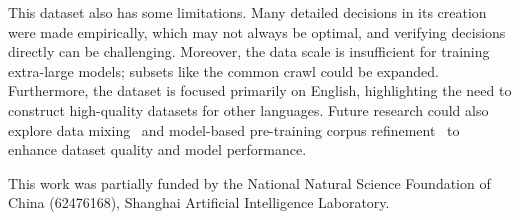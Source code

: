 This dataset also has some limitations. Many detailed decisions in its creation were made empirically, which may not always be optimal, and verifying decisions directly can be challenging. Moreover, the data scale is insufficient for training extra-large models; subsets like the common crawl could be expanded. Furthermore, the dataset is focused primarily on English, highlighting the need to construct high-quality datasets for other languages. Future research could also explore data mixing~\citep{liu2024regmix} and model-based pre-training corpus refinement~\citep{yu2024mates,zhou2024programming} to enhance dataset quality and model performance.

\begin{ack}
  This work was partially funded by the National Natural Science Foundation of China (62476168), Shanghai Artificial Intelligence Laboratory.
\end{ack}



